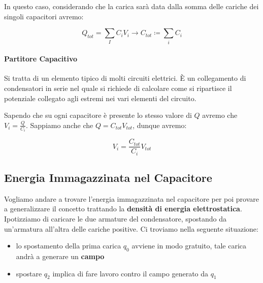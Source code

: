 In questo caso, considerando che la carica sarà data dalla somma delle cariche dei singoli capacitori avremo: 

\begin{large}
	\begin{equation} \label{eq_cap_parallelo}
		Q_{tot} = \sum_{I}  C_i V_i \rightarrow C_{tot} \coloneqq \sum_{i} C_i
	\end{equation}
\end{large}

\paragraph{Partitore Capacitivo}
Si tratta di un elemento tipico di molti circuiti elettrici. È un collegamento di condensatori in serie nel quale si richiede di calcolare come si ripartisce il potenziale collegato agli estremi nei vari elementi del circuito. 

\begin{figure}[ht]
	\centering
\end{figure}

Sapendo che su ogni capacitore è presente lo stesso valore di $Q$ avremo che $V_i = \frac{Q}{C_i}$. Sappiamo anche che $Q = C_{tot}V_{tot}$, dunque avremo: 

$$ 
V_i = \frac{C_{tot}}{C_i} V_{tot}
$$

\subsection{Energia Immagazzinata nel Capacitore}
Vogliamo andare a trovare l'energia immagazzinata nel capacitore per poi provare a generalizzare il concetto trattando la \textbf{densità di energia elettrostatica}. Ipotizziamo di caricare le due armature del condensatore, spostando da un'armatura all'altra delle cariche positive. Ci troviamo nella seguente situazione: 

\begin{itemize}
	\item lo spostamento della prima carica $q_0$ avviene in modo gratuito, tale carica andrà a generare un \textbf{campo}
	
	\item spostare $q_2$ implica di fare lavoro contro il campo generato da $q_1$
\end{itemize}

